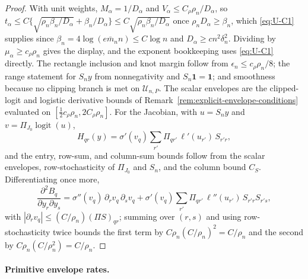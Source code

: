 \documentclass[11pt]{article}
\theoremstyle{definition}
\newcommand{\1}{\mathbf 1}\newcommand{\op}{\operatorname}
\begin{document}
\begin{proof}
With unit weights, $M_\alpha=1/D_\alpha$ and
$V_\alpha\le C_\rho\rho_n/D_\alpha$, so
$t_\alpha\le C\{\sqrt{\rho_n\beta_n/D_\alpha}+\beta_n/D_\alpha\}
\le C\sqrt{\rho_n\beta_n/D_\alpha}$ once
$\rho_nD_\alpha\ge\beta_n$, which \eqref{eq:U-C1} supplies since
$\beta_n=4\log(e\bar m_nn)\le C\log n$ and $D_\alpha\ge cn^2\delta_n^2$.
Dividing by $\mu_\alpha\ge c_\rho\rho_n$ gives the display, and the exponent
bookkeeping uses \eqref{eq:U-C1} directly.  The rectangle inclusion and knot
margin follow from $\epsilon_n\le c_\rho\rho_n/8$; the range statement for
$S_ny$ from nonnegativity and $S_n\mathbf 1=\mathbf 1$; and smoothness because
no clipping branch is met on $\mathcal U_{n,P}$.  The scalar envelopes are the
clipped-logit and logistic derivative bounds of
Remark~\ref{rem:explicit-envelope-conditions} evaluated on
$[\tfrac12c_\rho\rho_n,2C_\rho\rho_n]$.  For the Jacobian, with
$u=S_ny$ and $v=\Pi_{J_0}\operatorname{logit}(u)$,
\[
H_{qr}(y)=\sigma'(v_q)\sum_{r'}\Pi_{qr'}\,\ell'(u_{r'})\,S_{r'r},
\]
and the entry, row-sum, and column-sum bounds follow from the scalar envelopes,
row-stochasticity of $\Pi_{J_0}$ and $S_n$, and the column bound $C_S$.
Differentiating once more,
\[
\frac{\partial^2B_q}{\partial y_r\partial y_s}
=\sigma''(v_q)\,\partial_rv_q\,\partial_sv_q
+\sigma'(v_q)\sum_{r'}\Pi_{qr'}\,\ell''(u_{r'})\,S_{r'r}S_{r's},
\]
with $|\partial_rv_q|\le(C/\rho_n)(\Pi S)_{qr}$; summing over $(r,s)$ and using
row-stochasticity twice bounds the first term by
$C\rho_n(C/\rho_n)^2=C/\rho_n$ and the second by
$C\rho_n(C/\rho_n^2)=C/\rho_n$.
\end{proof}

\paragraph{Primitive envelope rates.}
\end{document}
